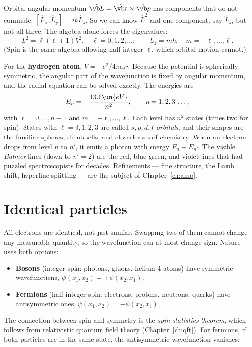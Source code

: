 Orbital angular momentum $\hat{\vb L} = \hat{\vb r}\times\hat{\vb p}$ has components that do not commute: $[\hat L_x,\hat L_y] = i\hbar\hat L_z$. So we can know $\hat L^2$ and one component, say $\hat L_z$, but not all three. The algebra alone forces the eigenvalues:
\[
  L^2 = \ell(\ell+1)\hbar^2,\quad\ell = 0,1,2,\dots;\qquad L_z = m\hbar,\quad m = -\ell,\dots,\ell.
\]
(Spin is the same algebra allowing half-integer $\ell$, which orbital motion cannot.)

For the \textbf{hydrogen atom}, $V = -e^2/4\pi\epsilon_0 r$. Because the potential is spherically symmetric, the angular part of the wavefunction is fixed by angular momentum, and the radial equation can be solved exactly. The energies are
\[
  E_n = -\frac{13.6\un{eV}}{n^2},\qquad n = 1,2,3,\dots,
\]
with $\ell = 0,\dots,n-1$ and $m = -\ell,\dots,\ell$. Each level has $n^2$ states (times two for spin). States with $\ell = 0,1,2,3$ are called $s,p,d,f$ \emph{orbitals}, and their shapes are the familiar spheres, dumbbells, and cloverleaves of chemistry. When an electron drops from level $n$ to $n'$, it emits a photon with energy $E_n - E_{n'}$. The visible \emph{Balmer} lines (down to $n'=2$) are the red, blue-green, and violet lines that had puzzled spectroscopists for decades. Refinements --- fine structure, the Lamb shift, hyperfine splitting --- are the subject of Chapter~\ref{ch:amo}.

\section{Identical particles}

All electrons are identical, not just similar. Swapping two of them cannot change any measurable quantity, so the wavefunction can at most change sign. Nature uses both options:
\begin{itemize}[itemsep=3pt]
  \item \textbf{Bosons} (integer spin: photons, gluons, helium-4 atoms) have symmetric wavefunctions, $\psi(x_1,x_2) = +\psi(x_2,x_1)$.
  \item \textbf{Fermions} (half-integer spin: electrons, protons, neutrons, quarks) have antisymmetric ones, $\psi(x_1,x_2) = -\psi(x_2,x_1)$.
\end{itemize}
The connection between spin and symmetry is the \emph{spin-statistics theorem}, which follows from relativistic quantum field theory (Chapter~\ref{ch:qft}). For fermions, if both particles are in the same state, the antisymmetric wavefunction vanishes:

